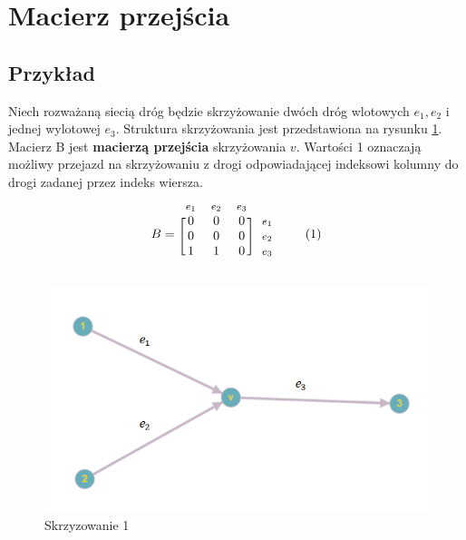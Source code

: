 \documentclass[12pt]{book}
\theoremstyle{plain}
\newcommand\addtag{\refstepcounter{equation}
\renewcommand{\labelenumii}{\theenumii}
\renewcommand{\theenumii}{\theenumi.\arabic{enumii}.}
\tag{\theequation}}
\begin{document}
\section{Macierz przejścia}
\subsection{Przykład}
Niech rozważaną siecią dróg będzie skrzyżowanie dwóch dróg wlotowych $e_1,e_2$ i jednej wylotowej $e_3$. Struktura skrzyżowania jest przedstawiona na rysunku \ref{fig:skrz_1}.
Macierz B jest \textbf{macierzą przejścia} skrzyżowania $v$. Wartości 1 oznaczają możliwy przejazd na skrzyżowaniu z drogi odpowiadającej indeksowi kolumny do drogi zadanej przez indeks wiersza.
\begin{equation*}
  B=
  \begin{blockarray}{*{3}{c} l}
    \begin{block}{*{3}{>{$\footnotesize}c<{$}} l}
     $e_1$ & $e_2$ & $e_3$\\
    \end{block}
    \begin{block}{[*{3}{c}]>{$\footnotesize}l<{$}}
       0 & 0 & 0 & $e_1$ \\
       0 & 0 & 0 & $e_2$ \\
       1 & 1 & 0 & $e_3$ \\
    \end{block}
  \end{blockarray} \addtag
\end{equation*}

\begin{figure}[H]
  \centering
    \includegraphics[width=14cm]{skrz_1}
 \caption{Skrzyzowanie 1}
 \label{fig:skrz_1}
\end{figure}
\end{document}
